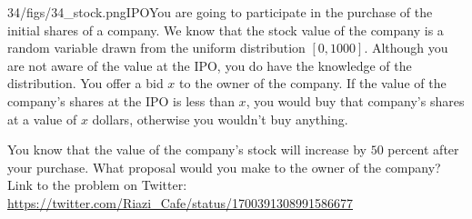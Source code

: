 \begin{problem}{34/figs/34_stock.png}{IPO}You are going to participate in the purchase of the initial shares of a company. We know that the stock value of the company is a random variable drawn from the uniform distribution $[0,1000]$. Although you are not aware of the value at the IPO, you do have the knowledge of the distribution. You offer a bid $x$ to the owner of the company. If the value of the company's shares at the IPO is less than $x$, you would buy that company's shares at a value of $x$ dollars, otherwise you wouldn't buy anything.

You know that the value of the company's stock will increase by $50$ percent after your purchase. What proposal would you make to the owner of the company?\\[0.2cm]

Link to the problem on Twitter:  \url{https://twitter.com/Riazi_Cafe/status/1700391308991586677}\end{problem}